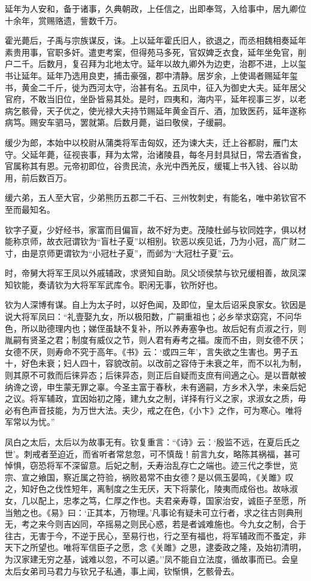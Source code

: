 \documentclass[]{article}
\begin{document}
延年为人安和，备于诸事，久典朝政，上任信之，出即奉驾，入给事中，居九卿位十余年，赏赐赂遗，訾数千万。

霍光薨后，子禹与宗族谋反，诛。上以延年霍氏旧人，欲退之，而丞相魏相奏延年素贵用事，官职多奸。遣吏考案，但得苑马多死，官奴婢乏衣食，延年坐免官，削户二千。后数月，复召拜为北地太守。延年以故九卿外为边吏，治郡不进，上以玺书让延年。延年乃选用良吏，捕击豪强，郡中清静。居岁余，上使谒者赐延年玺书，黄金二千斤，徙为西河太守，治甚有名。五凤中，征入为御史大夫。延年居父官府，不敢当旧位，坐卧皆易其处。是时，四夷和，海内平，延年视事三岁，以老病乞骸骨，天子优之，使光禄大夫持节赐延年黄金百斤、酒，加致医药，延年遂称病笃。赐安车驷马，罢就第。后数月薨，谥曰敬侯，子缓嗣。

缓少为郎，本始中以校尉从蒲类将军击匈奴，还为谏大夫，迁上谷都尉，雁门太守。父延年薨，征视丧事，拜为太常，治诸陵县，每冬月封具狱日，常去酒省食，官属称其有恩。元帝初即位，谷贵民流，永光中西羌反，缓辄上书入钱、谷以助用，前后数百万。

缓六弟，五人至大官，少弟熊历五郡二千石、三州牧刺史，有能名，唯中弟钦官不至而最知名。

钦字子夏，少好经书，家富而目偏盲，故不好为吏。茂陵杜邺与钦同姓字，俱以材能称京师，故衣冠谓钦为``盲杜子夏''以相别。钦恶以疾见诋，乃为小冠，高广财二寸，由是京师更谓钦为``小冠杜子夏''，而邺为``大冠杜子夏''云。

时，帝舅大将军王凤以外戚辅政，求贤知自助。凤父顷侯禁与钦兄缓相善，故凤深知钦能，奏请钦为大将军军武库令。职闲无事，钦所好也。

钦为人深博有谋。自上为太子时，以好色闻，及即位，皇太后诏采良家女。钦因是说大将军凤曰：``礼壹娶九女，所以极阳数，广嗣重祖也；必乡举求窈窕，不问华色，所以助德理内也；娣侄虽缺不复补，所以养寿塞争也。故后妃有贞淑之行，则胤嗣有贤圣之君；制度有威仪之节，则人君有寿考之福。废而不由，则女德不厌；女德不厌，则寿命不究于高年。《书》云：`或四三年'，言失欲之生害也。男子五十，好色未衰；妇人四十，容貌改前。以改前之容侍于未衰之年，而不以礼为制，则其原不可救而后徕异态；后徕异态，则正后自疑而支庶有间適之心。是以晋献被纳谗之谤，申生蒙无罪之辜。今圣主富于春秋，未有適嗣，方乡术入学，未亲后妃之议。将军辅政，宜因始初之隆，建九女之制，详择有行义之家，求淑女之质，毋必有色声音技能，为万世大法。夫少，戒之在色，《小卞》之作，可为寒心。唯将军常以为忧。''

凤白之太后，太后以为故事无有。钦复重言：``《诗》云：`殷监不远，在夏后氏之世'。刺戒者至迫近，而省听者常怠忽，可不慎哉！前言九女，略陈其祸福，甚可悼惧，窃恐将军不深留意。后妃之制，夭寿治乱存亡之端也。迹三代之季世，览宗、宣之飨国，察近属之符验，祸败曷常不由女德？是以佩玉晏鸣，《关雎》叹之，知好色之伐性短年，离制度之生无厌，天下将蒙化，陵夷而成俗也。故咏淑女，几以配上，忠孝之笃，仁厚之作也。夫君亲寿尊，国家治安，诚臣子至愿，所当勉之也。《易》曰：`正其本，万物理。'凡事论有疑未可立行者，求之往古则典刑无，考之来今则吉凶同，卒摇易之则民心惑，若是者诚难施也。今九女之制，合于往古，无害于今，不逆于民心，至易行也，行之至有福也，将军辅政而不蚤定，非天下之所望也。唯将军信臣子之愿，念《关雎》之思，逮委政之隆，及始初清明，为汉家建无穷之基，诚难以忽，不可以遴。''凤不能自立法度，循故事而已。会皇太后女弟司马君力与钦兄子私通，事上闻，钦惭惧，乞骸骨去。
\end{document}
